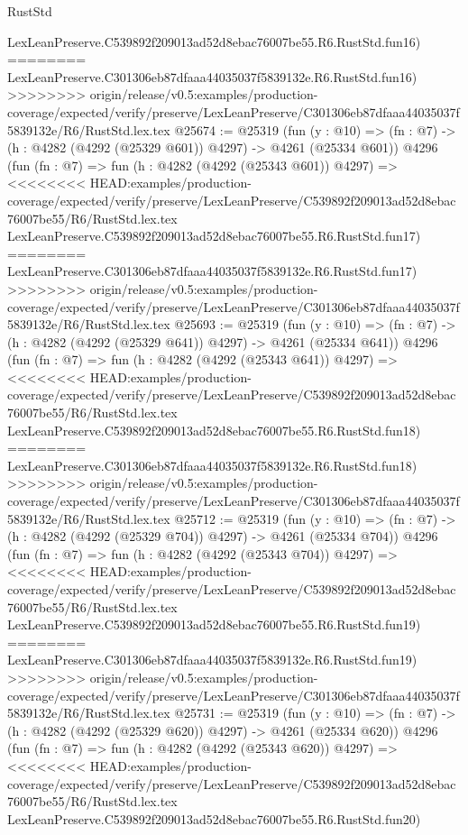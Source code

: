 \begin{lexlean}{RustStd}
\begin{coremodule}
{\begin{coremodule}
{{{{{{{{{{{{{{{{{{{{{{{{{{{{{{{{{{{    LexLeanPreserve.C539892f209013ad52d8ebac76007be55.R6.RustStd.fun16)
========
    LexLeanPreserve.C301306eb87dfaaa44035037f5839132e.R6.RustStd.fun16)
>>>>>>>> origin/release/v0.5:examples/production-coverage/expected/verify/preserve/LexLeanPreserve/C301306eb87dfaaa44035037f5839132e/R6/RustStd.lex.tex
@25674 := @25319
    (fun (y : @10) => (fn : @7) -> (h : @4282 (@4292 (@25329 @601)) @4297) -> @4261 (@25334 @601))
    @4296
    (fun (fn : @7) =>
    fun (h : @4282 (@4292 (@25343 @601)) @4297) =>
<<<<<<<< HEAD:examples/production-coverage/expected/verify/preserve/LexLeanPreserve/C539892f209013ad52d8ebac76007be55/R6/RustStd.lex.tex
    LexLeanPreserve.C539892f209013ad52d8ebac76007be55.R6.RustStd.fun17)
========
    LexLeanPreserve.C301306eb87dfaaa44035037f5839132e.R6.RustStd.fun17)
>>>>>>>> origin/release/v0.5:examples/production-coverage/expected/verify/preserve/LexLeanPreserve/C301306eb87dfaaa44035037f5839132e/R6/RustStd.lex.tex
@25693 := @25319
    (fun (y : @10) => (fn : @7) -> (h : @4282 (@4292 (@25329 @641)) @4297) -> @4261 (@25334 @641))
    @4296
    (fun (fn : @7) =>
    fun (h : @4282 (@4292 (@25343 @641)) @4297) =>
<<<<<<<< HEAD:examples/production-coverage/expected/verify/preserve/LexLeanPreserve/C539892f209013ad52d8ebac76007be55/R6/RustStd.lex.tex
    LexLeanPreserve.C539892f209013ad52d8ebac76007be55.R6.RustStd.fun18)
========
    LexLeanPreserve.C301306eb87dfaaa44035037f5839132e.R6.RustStd.fun18)
>>>>>>>> origin/release/v0.5:examples/production-coverage/expected/verify/preserve/LexLeanPreserve/C301306eb87dfaaa44035037f5839132e/R6/RustStd.lex.tex
@25712 := @25319
    (fun (y : @10) => (fn : @7) -> (h : @4282 (@4292 (@25329 @704)) @4297) -> @4261 (@25334 @704))
    @4296
    (fun (fn : @7) =>
    fun (h : @4282 (@4292 (@25343 @704)) @4297) =>
<<<<<<<< HEAD:examples/production-coverage/expected/verify/preserve/LexLeanPreserve/C539892f209013ad52d8ebac76007be55/R6/RustStd.lex.tex
    LexLeanPreserve.C539892f209013ad52d8ebac76007be55.R6.RustStd.fun19)
========
    LexLeanPreserve.C301306eb87dfaaa44035037f5839132e.R6.RustStd.fun19)
>>>>>>>> origin/release/v0.5:examples/production-coverage/expected/verify/preserve/LexLeanPreserve/C301306eb87dfaaa44035037f5839132e/R6/RustStd.lex.tex
@25731 := @25319
    (fun (y : @10) => (fn : @7) -> (h : @4282 (@4292 (@25329 @620)) @4297) -> @4261 (@25334 @620))
    @4296
    (fun (fn : @7) =>
    fun (h : @4282 (@4292 (@25343 @620)) @4297) =>
<<<<<<<< HEAD:examples/production-coverage/expected/verify/preserve/LexLeanPreserve/C539892f209013ad52d8ebac76007be55/R6/RustStd.lex.tex
    LexLeanPreserve.C539892f209013ad52d8ebac76007be55.R6.RustStd.fun20)
}}}}}}}}}}}}}}}}}}}}}}}}}}}}}}}}}}}
\end{coremodule}}
\end{coremodule}
\end{lexlean}
